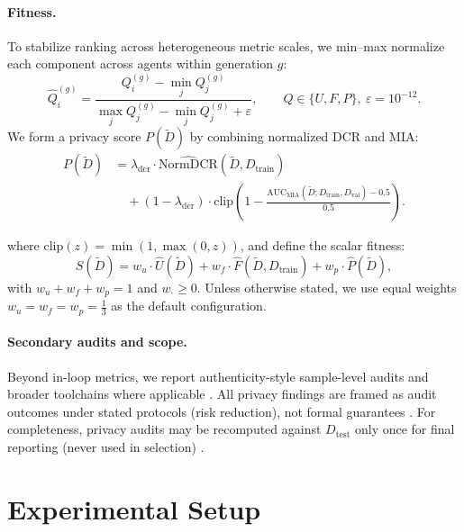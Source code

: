 \documentclass[preprint,12pt]{elsarticle}
\begin{document}
\paragraph{Fitness.}
To stabilize ranking across heterogeneous metric scales, we min--max normalize each component across agents within generation $g$:
\begin{equation}
\hat{Q}_i^{(g)}=\frac{Q_i^{(g)}-\min_j Q_j^{(g)}}{\max_j Q_j^{(g)}-\min_j Q_j^{(g)}+\varepsilon},\qquad Q\in\{U,F,P\},\ \varepsilon=10^{-12}.
\label{eq:minmax}
\end{equation}
We form a privacy score $P(\tilde{D})$ by combining normalized DCR and MIA:
\begin{equation}
\begin{aligned}
P(\tilde{D}) &= \lambda_{\mathrm{dcr}}\cdot \widehat{\mathrm{NormDCR}}(\tilde{D},D_{\text{train}}) \\
&\quad + (1-\lambda_{\mathrm{dcr}})\cdot \mathrm{clip}\!\left(
1 - \frac{\mathrm{AUC}_{\mathrm{MIA}}(\tilde{D};D_{\text{train}},D_{\text{val}})-0.5}{0.5}
\right).
\end{aligned}
\end{equation}

where $\mathrm{clip}(z)=\min(1,\max(0,z))$, and define the scalar fitness:
\begin{equation}
S(\tilde{D}) = w_u \cdot \hat{U}(\tilde{D}) + w_f \cdot \hat{F}(\tilde{D},D_{\text{train}}) + w_p \cdot \hat{P}(\tilde{D}),
\label{eq:fitness}
\end{equation}
with $w_u+w_f+w_p=1$ and $w_{\cdot}\ge 0$. Unless otherwise stated, we use equal weights 
$w_u = w_f = w_p = \frac{1}{3}$ as the default configuration.

\paragraph{Secondary audits and scope.}
Beyond in-loop metrics, we report authenticity-style sample-level audits and broader toolchains where applicable \cite{Alaa2022,lautrup2025syntheval}. All privacy findings are framed as audit outcomes under stated protocols (risk reduction), not formal guarantees \cite{Hernandez2025}. For completeness, privacy audits may be recomputed against $D_{\text{test}}$ only once for final reporting (never used in selection) \cite{Hyrup2025}.


\section{Experimental Setup}
\label{sec:experiments}
\end{document}
